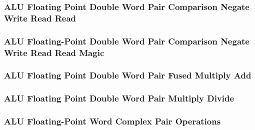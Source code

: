 \subsubsection[{\small ALU Floating Point Double Word Pair Comparison Negate Write Read Read}]{ALU Floating Point Double Word Pair Comparison Negate Write Read Read} \label{sec:format-ALU-FDPCNWRR}



\subsubsection[{\small ALU Floating-Point Double Word Pair Comparison Negate Write Read Read Magic}]{ALU Floating-Point Double Word Pair Comparison Negate Write Read Read Magic} \label{sec:format-ALU-FDPCNWRR.M}



\subsubsection[{\small ALU Floating Point Double Word Pair Fused Multiply Add}]{ALU Floating Point Double Word Pair Fused Multiply Add} \label{sec:format-ALU-FDPFMA}



\subsubsection[{\small ALU Floating Point Double Word Pair Multiply Divide}]{ALU Floating Point Double Word Pair Multiply Divide} \label{sec:format-ALU-FDPMUL}



\subsubsection[{\small ALU Floating-Point Word Complex Pair Operations}]{ALU Floating-Point Word Complex Pair Operations} \label{sec:format-ALU-FWCPOP}

